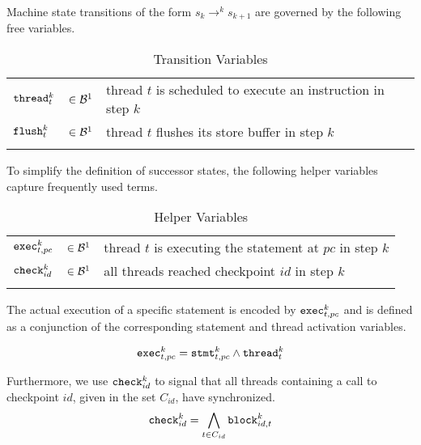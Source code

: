 \bigskip

Machine state transitions of the form $s_k \to^k s_{k + 1}$ are governed by the following free variables.

\begin{longtabu}{llX}
  \firsthline
  $\THREAD^k_t$ & $\in \BVSORT[1]$ & thread $t$ is scheduled to execute an instruction in step $k$ \\
  $\FLUSH^k_t$ & $\in \BVSORT[1]$ & thread $t$ flushes its store buffer in step $k$ \\
  \lasthline
  \caption{Transition Variables}
  \label{tbl:encoding:transitions}
\end{longtabu}

To simplify the definition of successor states, the following helper variables capture frequently used terms.

\begin{longtabu}{llX}
  \firsthline
  $\EXEC^k_{t, pc}$ & $\in \BVSORT[1]$ & thread $t$ is executing the statement at $pc$ in step $k$ \\
  $\CHECK^k_{id}$ & $\in \BVSORT[1]$ & all threads reached checkpoint $id$ in step $k$ \\
  \lasthline
  \caption{Helper Variables}
\end{longtabu}

The actual execution of a specific statement is encoded by $\EXEC^k_{t, pc}$ and
is defined as a conjunction of the corresponding statement and thread activation variables.

\[
  \EXEC^k_{t, pc} = \STMT^k_{t, pc} \land \THREAD^k_t
\]

Furthermore, we use $\CHECK^k_{id}$ to signal that all threads containing a call to checkpoint $id$, given in the set $C_{id}$, have synchronized.%
\[
  \CHECK^k_{id} = \bigwedge_{t \in C_{id}} \BLOCK^k_{id, t}
\]

